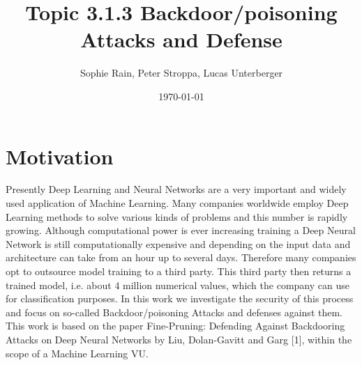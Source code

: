 \documentclass[a4paper,12pt]{article}
\title{Topic 3.1.3 Backdoor/poisoning Attacks and Defense}
\author{Sophie Rain, Peter Stroppa, Lucas Unterberger}
\date{\today}
\begin{document}
	
	
	
\maketitle
	
	
\section{Motivation}
Presently Deep Learning and Neural Networks are a very important and widely used application of Machine Learning. Many companies worldwide employ Deep Learning methods to solve various kinds of problems and this number is rapidly growing. Although computational power is ever increasing training a Deep Neural Network is still computationally expensive and depending on the input data and architecture can take from an hour up to several days. Therefore many companies opt to outsource model training to a third party. This third party then returns a trained model, i.e. about 4 million numerical values, which the company can use for classification purposes.
In this work we investigate the security of this process and focus on so-called Backdoor/poisoning Attacks and defenses against them. This work is based on the paper Fine-Pruning: Defending Against Backdooring Attacks on Deep Neural Networks by Liu, Dolan-Gavitt and Garg [1], within the scope of a Machine Learning VU.
\end{document}
